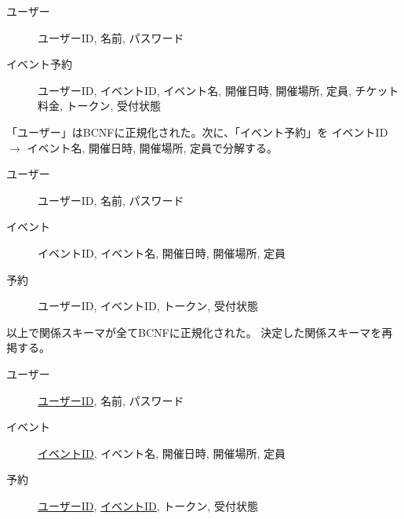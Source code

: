 \documentclass[dvipdfmx]{jarticle}
\begin{document}
\begin{description}
  \item[ユーザー] {ユーザーID, 名前, パスワード}
  \item[イベント予約] {ユーザーID, イベントID, イベント名, 開催日時, 開催場所, 定員, チケット料金, トークン, 受付状態}
\end{description}

「ユーザー」はBCNFに正規化された。次に、「イベント予約」を
{イベントID} $\rightarrow$ {イベント名, 開催日時, 開催場所, 定員}で分解する。

\begin{description}
  \item[ユーザー] {ユーザーID, 名前, パスワード}
  \item[イベント] {イベントID, イベント名, 開催日時, 開催場所, 定員}
  \item[予約] {ユーザーID, イベントID, トークン, 受付状態}
\end{description}

以上で関係スキーマが全てBCNFに正規化された。
決定した関係スキーマを再掲する。

\begin{description}
  \item[ユーザー] \underline{ユーザーID}, 名前, パスワード
  \item[イベント] \underline{イベントID}, イベント名, 開催日時, 開催場所, 定員
  \item[予約] \underline{ユーザーID}, \underline{イベントID}, トークン, 受付状態
\end{description}
\end{document}
